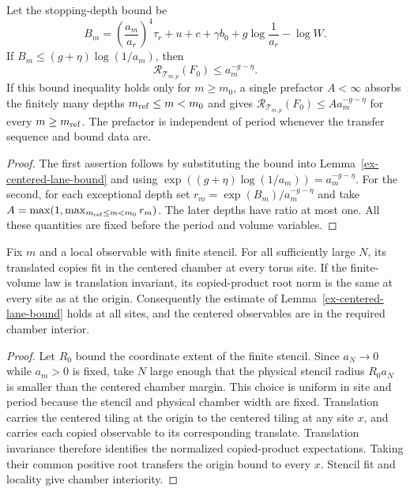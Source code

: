 \begin{lemma}\label{ex-centered-scale}
Let the stopping-depth bound be
\[
 B_m=\left(\frac{a_m}{a_r}\right)^4\tau_r+u+c+\gamma b_0
                 +g\log\frac1{a_r}-\log W.
\]
If $B_m\leq(g+\eta)\log(1/a_m)$, then
\[
 \mathcal R_{\mathcal T_{m,p}}(F_0)\leq a_m^{-g-\eta}.
\]
If this bound inequality holds only for $m\geq m_0$, a single prefactor $A<\infty$ absorbs the finitely many depths $m_{\rm ref}\leq m<m_0$ and gives $\mathcal R_{\mathcal T_{m,p}}(F_0)\leq A a_m^{-g-\eta}$ for every $m\geq m_{\rm ref}$. The prefactor is independent of period whenever the transfer sequence and bound data are.
\end{lemma}
\begin{proof}
The first assertion follows by substituting the bound into Lemma~\ref{ex-centered-lane-bound} and using $\exp((g+\eta)\log(1/a_m))=a_m^{-g-\eta}$. For the second, for each exceptional depth set $r_m=\exp(B_m)/a_m^{-g-\eta}$ and take $A=\max(1,\max_{m_{\rm ref}\leq m<m_0}r_m)$. The later depths have ratio at most one. All these quantities are fixed before the period and volume variables.
\end{proof}

\begin{lemma}\label{ex-centered-all-sites}
Fix $m$ and a local observable with finite stencil. For all sufficiently large $N$, its translated copies fit in the centered chamber at every torus site. If the finite-volume law is translation invariant, its copied-product root norm is the same at every site as at the origin. Consequently the estimate of Lemma~\ref{ex-centered-lane-bound} holds at all sites, and the centered observables are in the required chamber interior.
\end{lemma}
\begin{proof}
Let $R_0$ bound the coordinate extent of the finite stencil. Since $a_N\to0$ while $a_m>0$ is fixed, take $N$ large enough that the physical stencil radius $R_0a_N$ is smaller than the centered chamber margin. This choice is uniform in site and period because the stencil and physical chamber width are fixed. Translation carries the centered tiling at the origin to the centered tiling at any site $x$, and carries each copied observable to its corresponding translate. Translation invariance therefore identifies the normalized copied-product expectations. Taking their common positive root transfers the origin bound to every $x$. Stencil fit and locality give chamber interiority.
\end{proof}


